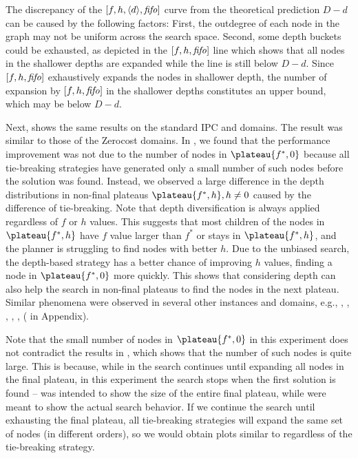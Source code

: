 The discrepancy of the $[f,h,{\left<d\right>},{\text{\textit{fifo}}}]$ curve from the theoretical prediction $D-d$ can be caused by the 
following factors: First, the outdegree of each node in the graph may not be
uniform across the search space. Second, some depth buckets could be
exhausted, as depicted in the  $[f,h,{\text{\textit{fifo}}}]$ line which
shows that all nodes in the shallower depths are expanded while the line is still below $D-d$.
Since $[f,h,{\text{\textit{fifo}}}]$ exhaustively expands the nodes in shallower depth,
the number of expansion by $[f,h,{\text{\textit{fifo}}}]$ in the shallower depths constitutes an upper bound, which may be below $D-d$.

Next,  shows the same results on the standard IPC
 and  domains.
The  result was similar to those of the Zerocost domains.
In ,
we found that the performance improvement was not due to the number of nodes in $\plateau{f^*,0}$ because all tie-breaking strategies have generated only a small number of such nodes before the solution was found.
Instead, we observed a large difference in the depth distributions in non-final plateaus $\plateau{f^*,h}, h\not=0$ caused by the difference of tie-breaking.
Note that depth diversification is always applied regardless of $f$ or $h$ values.
This suggests that most children of the nodes in $\plateau{f^*,h}$ have $f$ value larger than $f^*$ or stays in $\plateau{f^*,h}$, and the planner is struggling to find nodes with better $h$.
Due to the unbiased search, the depth-based strategy has a better chance of improving $h$ values, finding a node in $\plateau{f^*,0}$ more quickly.
This shows that considering depth can also help the search in non-final plateaus to find the nodes in the next plateau.
Similar phenomena were observed in several other instances and domains, e.g., , , , , ,  ( in Appendix).

Note that the small number of nodes in $\plateau{f^*,0}$ in this experiment does not contradict the results in ,  which shows that  the number of such nodes is quite large.
This is because, while in  the search continues until expanding all nodes in the final plateau, in this experiment the search stops when the first solution is found --   was intended to show the size of the entire final plateau, while  were meant to show the actual search behavior. If we continue the search until exhausting the final plateau, all tie-breaking strategies will expand the same set of nodes (in different orders), so we would obtain plots similar to  regardless of the tie-breaking strategy.

